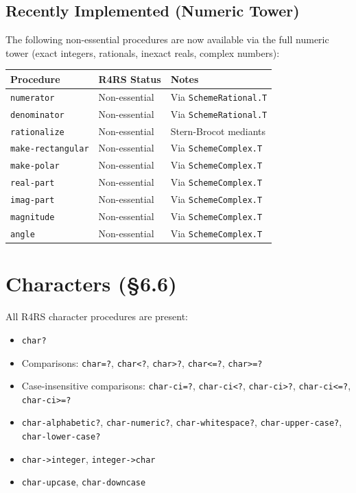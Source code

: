 \documentclass[12pt]{report}
\begin{document}
\subsection{Recently Implemented (Numeric Tower)}

The following non-essential procedures are now available via the full
numeric tower (exact integers, rationals, inexact reals, complex numbers):

\begin{center}
\begin{tabular}{lll}
\toprule
\textbf{Procedure} & \textbf{R4RS Status} & \textbf{Notes} \\
\midrule
{\tt numerator} & Non-essential & Via {\tt SchemeRational.T} \\
{\tt denominator} & Non-essential & Via {\tt SchemeRational.T} \\
{\tt rationalize} & Non-essential & Stern-Brocot mediants \\
{\tt make-rectangular} & Non-essential & Via {\tt SchemeComplex.T} \\
{\tt make-polar} & Non-essential & Via {\tt SchemeComplex.T} \\
{\tt real-part} & Non-essential & Via {\tt SchemeComplex.T} \\
{\tt imag-part} & Non-essential & Via {\tt SchemeComplex.T} \\
{\tt magnitude} & Non-essential & Via {\tt SchemeComplex.T} \\
{\tt angle} & Non-essential & Via {\tt SchemeComplex.T} \\
\bottomrule
\end{tabular}
\end{center}

\section{Characters (\S6.6)}

All R4RS character procedures are present:

\begin{itemize}[nosep]
\item {\tt char?}
\item Comparisons: {\tt char=?}, {\tt char<?}, {\tt char>?},
  {\tt char<=?}, {\tt char>=?}
\item Case-insensitive comparisons: {\tt char-ci=?}, {\tt char-ci<?},
  {\tt char-ci>?}, {\tt char-ci<=?}, {\tt char-ci>=?}
\item {\tt char-alphabetic?}, {\tt char-numeric?}, {\tt char-whitespace?},
  {\tt char-upper-case?}, {\tt char-lower-case?}
\item {\tt char->integer}, {\tt integer->char}
\item {\tt char-upcase}, {\tt char-downcase}
\end{itemize}
\end{document}
